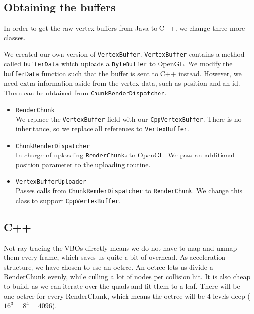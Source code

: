\documentclass[]{article}
\begin{document}
\subsection{Obtaining the buffers}
In order to get the raw vertex buffers from Java to C++, we change three more classes.

We created our own version of \texttt{VertexBuffer}.
\texttt{VertexBuffer} contains a method called \texttt{bufferData} which uploads a \texttt{ByteBuffer} to OpenGL.
We modify the \texttt{bufferData} function such that the buffer is sent to C++ instead.
However, we need extra information aside from the vertex data, such as position and an id.
These can be obtained from \texttt{ChunkRenderDispatcher}.

\begin{itemize}
  \item \texttt{RenderChunk} \\
    We replace the \texttt{VertexBuffer} field with our \texttt{CppVertexBuffer}.
    There is no inheritance, so we replace all references to \texttt{VertexBuffer}.
  \item \texttt{ChunkRenderDispatcher} \\
    In charge of uploading \texttt{RenderChunk}s to OpenGL.
    We pass an additional position parameter to the uploading routine.
  \item \texttt{VertexBufferUploader} \\
  Passes calls from \texttt{ChunkRenderDispatcher} to \texttt{RenderChunk}.
  We change this class to support \texttt{CppVertexBuffer}.
\end{itemize}

\subsection{C++}
Not ray tracing the VBOs directly means we do not have to map and unmap them every frame, which saves us quite a bit of overhead.
As acceleration structure, we have chosen to use an octree.
An octree lets us divide a RenderChunk evenly, while culling a lot of nodes per collision hit.
It is also cheap to build, as we can iterate over the quads and fit them to a leaf.
There will be one octree for every RenderChunk, which means the octree will be 4 levels deep ($16^{3} = 8^{4} = 4096$).
\end{document}
